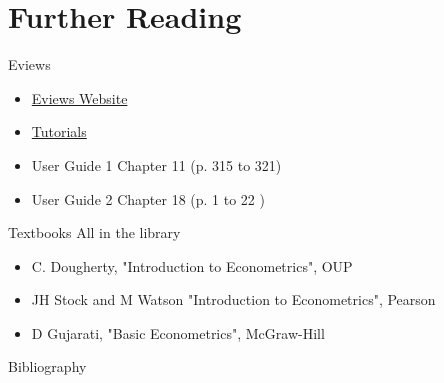 \documentclass[14pt,xcolor=pdftex,dvipsnames,table]{beamer}\usepackage[]{graphicx}\usepackage[]{color}
\begin{document}
\section{Further Reading}
\begin{frame}{Eviews}
\begin{itemize}[<+-| alert@+>]
\item \href{http://www.eviews.com/home.html}{Eviews Website}
\item \href{http://www.eviews.com/Learning/index.html}{Tutorials}
\item User Guide 1 Chapter 11 (p. 315 to 321)
\item User Guide 2 Chapter 18 (p. 1 to 22 )
\end{itemize}
\end{frame}

\begin{frame}{Textbooks}
All in the library
\pause
\begin{itemize}[<+-| alert@+>]
\item C. Dougherty, "Introduction to Econometrics", OUP
\item JH Stock and M Watson "Introduction to Econometrics",  Pearson
\item D Gujarati, "Basic Econometrics", McGraw-Hill
\end{itemize}  
\end{frame}



\begin{frame}{Bibliography}

\end{frame}
\end{document}

